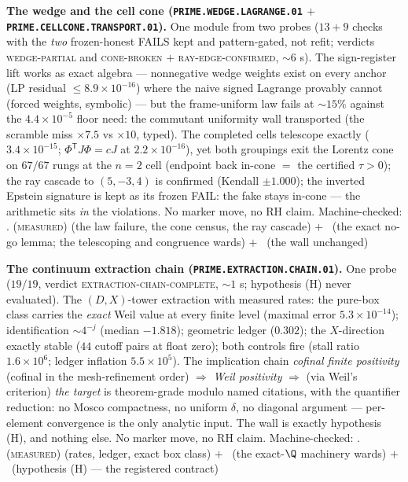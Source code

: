 \documentclass[11pt,a4paper]{article}
\theoremstyle{definition}
\begin{document}
\par\smallskip\noindent\textbf{The wedge and the cell cone
(\texttt{PRIME.WEDGE.LAGRANGE.01} $+$
\texttt{PRIME.CELLCONE.TRANSPORT.01}).}
One module from two probes ($13 + 9$ checks with the \emph{two}
frozen-honest FAILS kept and pattern-gated, not refit; verdicts
\textsc{wedge-partial} and \textsc{cone-broken} $+$
\textsc{ray-edge-confirmed}, ${\sim}6$ s).  The sign-register
lift works as exact algebra --- nonnegative wedge weights exist
on every anchor (LP residual $\le 8.9\times10^{-16}$) where the
naive signed Lagrange provably cannot (forced weights,
symbolic) --- but the frame-uniform law fails at ${\sim}15\%$
against the $4.4\times10^{-5}$ floor need: the commutant
uniformity wall transported (the scramble miss $\times7.5$ vs
$\times10$, typed).  The completed cells telescope exactly
($3.4\times10^{-15}$; $\Phi^{\mathsf T}J\Phi = cJ$ at
$2.2\times10^{-16}$), yet both groupings exit the Lorentz cone
on $67/67$ rungs at the $n = 2$ cell (endpoint back in-cone $=$
the certified $\tau > 0$); the ray cascade to $(5,-3,4)$ is
confirmed (Kendall $\pm1.000$); the inverted Epstein signature
is kept as its frozen FAIL: the fake stays in-cone --- the
arithmetic sits \emph{in} the violations.  No marker move, no RH
claim.
Machine-checked: .
(\textsc{measured}) (the law failure, the cone census, the ray
cascade) $+$ \mE\ (the exact no-go lemma; the telescoping and
congruence wards) $+$ \mO\ (the wall unchanged)
\par\smallskip

\par\smallskip\noindent\textbf{The continuum extraction chain
(\texttt{PRIME.EXTRACTION.CHAIN.01}).}
One probe ($19/19$, verdict
\textsc{extraction-chain-complete}, ${\sim}1$ s; hypothesis (H)
never evaluated).  The $(D, X)$-tower extraction with measured
rates: the pure-box class carries the \emph{exact} Weil value at
every finite level (maximal error $5.3\times10^{-14}$);
identification ${\sim}4^{-j}$ (median $-1.818$); geometric
ledger ($0.302$); the $X$-direction exactly stable ($44$ cutoff
pairs at float zero); both controls fire (stall ratio
$1.6\times10^6$; ledger inflation $5.5\times10^5$).  The
implication chain \emph{cofinal finite positivity} (cofinal in
the mesh-refinement order) $\Rightarrow$
\emph{Weil positivity} $\Rightarrow$ (via Weil's criterion)
\emph{the target} is theorem-grade modulo named citations, with
the quantifier reduction: no Mosco compactness, no uniform
$\delta$, no diagonal argument --- per-element convergence is
the only analytic input.  The wall is exactly hypothesis (H),
and nothing else.  No marker move, no RH claim.
Machine-checked: .
(\textsc{measured}) (rates, ledger, exact box class) $+$ \mE\
(the exact-$\Q$ machinery wards) $+$ \mO\ (hypothesis (H) ---
the registered contract)
\par\smallskip
\end{document}
